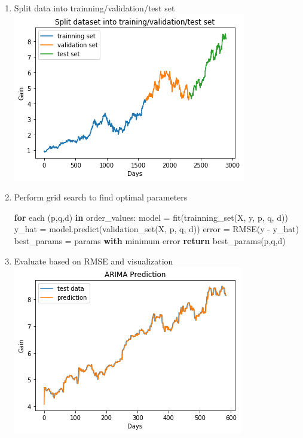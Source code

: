 \documentclass[11pt]{article}
\makeatletter
\def\maxwidth{\ifdim\Gin@nat@width>\linewidth\linewidth
    \else\Gin@nat@width\fi}
\let\Oldincludegraphics\includegraphics
\renewcommand{\includegraphics}[1]{\Oldincludegraphics[width=.8\maxwidth]{#1}}
\newenvironment{Shaded}{}{}
\newcommand{\KeywordTok}[1]{\textcolor[rgb]{0.00,0.44,0.13}{\textbf{{#1}}}}
\newcommand{\NormalTok}[1]{{#1}}
\newcommand{\ControlFlowTok}[1]{\textcolor[rgb]{0.00,0.44,0.13}{\textbf{{#1}}}}
\newcommand{\OperatorTok}[1]{\textcolor[rgb]{0.40,0.40,0.40}{{#1}}}
\makeatother
\begin{document}
\begin{enumerate}
\def\labelenumi{\arabic{enumi}.}
\item
  Split data into trainning/validation/test set
  \includegraphics{./figures/16.jpg}
\item
  Perform grid search to find optimal parameters

\begin{Shaded}
\begin{Highlighting}[]
\ControlFlowTok{for}\NormalTok{ each (p,q,d) }\KeywordTok{in}\NormalTok{ order_values:}
\NormalTok{    model }\OperatorTok{=}\NormalTok{ fit(trainning_set(X, y, p, q, d))}
\NormalTok{    y_hat }\OperatorTok{=}\NormalTok{ model.predict(validation_set(X, p, q, d))}
\NormalTok{    error }\OperatorTok{=}\NormalTok{ RMSE(y }\OperatorTok{-}\NormalTok{ y_hat)}
\NormalTok{    best_params }\OperatorTok{=}\NormalTok{ params }\ControlFlowTok{with}\NormalTok{ minimum error}
\ControlFlowTok{return}\NormalTok{ best_params(p,q,d)}
\end{Highlighting}
\end{Shaded}
\item
  Evaluate based on RMSE and visualization
  \includegraphics{./figures/18.jpg}
\end{enumerate}
\end{document}
